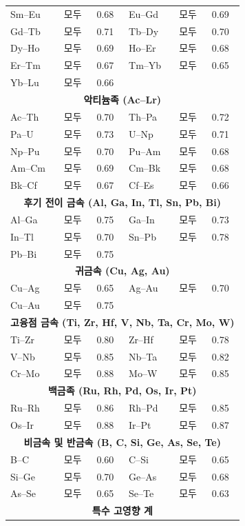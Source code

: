 \documentclass[12pt,a4paper]{article}
\begin{document}
\begin{longtable}{p{1.5cm}p{1.5cm}p{1.2cm}p{1.2cm}p{1.2cm}p{1.2cm}}
		Sm–Eu & 모두 & 0.68 & Eu–Gd & 모두 & 0.69 \\
		Gd–Tb & 모두 & 0.71 & Tb–Dy & 모두 & 0.70 \\
		Dy–Ho & 모두 & 0.69 & Ho–Er & 모두 & 0.68 \\
		Er–Tm & 모두 & 0.67 & Tm–Yb & 모두 & 0.65 \\
		Yb–Lu & 모두 & 0.66 & & & \\
		\multicolumn{6}{c}{\textbf{악티늄족 (Ac–Lr)}} \\
		Ac–Th & 모두 & 0.70 & Th–Pa & 모두 & 0.72 \\
		Pa–U  & 모두 & 0.73 & U–Np & 모두 & 0.71 \\
		Np–Pu & 모두 & 0.70 & Pu–Am & 모두 & 0.68 \\
		Am–Cm & 모두 & 0.69 & Cm–Bk & 모두 & 0.68 \\
		Bk–Cf & 모두 & 0.67 & Cf–Es & 모두 & 0.66 \\
		\multicolumn{6}{c}{\textbf{후기 전이 금속 (Al, Ga, In, Tl, Sn, Pb, Bi)}} \\
		Al–Ga & 모두 & 0.75 & Ga–In & 모두 & 0.73 \\
		In–Tl & 모두 & 0.70 & Sn–Pb & 모두 & 0.78 \\
		Pb–Bi & 모두 & 0.75 & & & \\
		\multicolumn{6}{c}{\textbf{귀금속 (Cu, Ag, Au)}} \\
		Cu–Ag & 모두 & 0.65 & Ag–Au & 모두 & 0.70 \\
		Cu–Au & 모두 & 0.75 & & & \\
		\multicolumn{6}{c}{\textbf{고융점 금속 (Ti, Zr, Hf, V, Nb, Ta, Cr, Mo, W)}} \\
		Ti–Zr & 모두 & 0.80 & Zr–Hf & 모두 & 0.78 \\
		V–Nb & 모두 & 0.85 & Nb–Ta & 모두 & 0.82 \\
		Cr–Mo & 모두 & 0.88 & Mo–W & 모두 & 0.85 \\
		\multicolumn{6}{c}{\textbf{백금족 (Ru, Rh, Pd, Os, Ir, Pt)}} \\
		Ru–Rh & 모두 & 0.86 & Rh–Pd & 모두 & 0.85 \\
		Os–Ir & 모두 & 0.88 & Ir–Pt & 모두 & 0.87 \\
		\multicolumn{6}{c}{\textbf{비금속 및 반금속 (B, C, Si, Ge, As, Se, Te)}} \\
		B–C  & 모두 & 0.60 & C–Si  & 모두 & 0.65 \\
		Si–Ge & 모두 & 0.70 & Ge–As & 모두 & 0.68 \\
		As–Se & 모두 & 0.65 & Se–Te & 모두 & 0.63 \\
		\multicolumn{6}{c}{\textbf{특수 고영향 계}} \\

\end{longtable}
\end{document}
